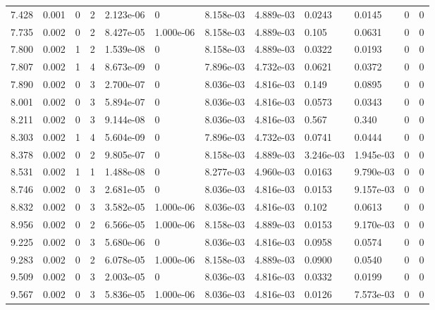 \documentclass[preview]{standalone}
\begin{document}
{{{\begin{tabular}{L{1.2cm}C{1.2cm} C{0.3cm}C{0.5cm} C{1.4cm}C{1.4cm} C{1.4cm}C{1.4cm} C{1.6cm}C{1.6cm} C{1.6cm}C{1.6cm}}
  7.428  &  0.001  & 0     &  2 &  2.123e-06  & 0  &  8.158e-03&   4.889e-03& 0.0243 & 0.0145   &  0 & 0  \\ 
  7.735  &  0.002  & 0     &  2 &  8.427e-05  & 1.000e-06  &  8.158e-03&   4.889e-03& 0.105 & 0.0631   &  0 & 0  \\ 
  7.800  &  0.002  & 1     &  2 &  1.539e-08  & 0  &  8.158e-03&   4.889e-03& 0.0322 & 0.0193   &  0 & 0  \\ 
  7.807  &  0.002  & 1     &  4 &  8.673e-09  & 0  &  7.896e-03&   4.732e-03& 0.0621 & 0.0372   &  0 & 0  \\ 
  7.890  &  0.002  & 0     &  3 &  2.700e-07  & 0  &  8.036e-03&   4.816e-03& 0.149 & 0.0895   &  0 & 0  \\ 
  8.001  &  0.002  & 0     &  3 &  5.894e-07  & 0  &  8.036e-03&   4.816e-03& 0.0573 & 0.0343   &  0 & 0  \\ 
  8.211  &  0.002  & 0     &  3 &  9.144e-08  & 0  &  8.036e-03&   4.816e-03& 0.567 & 0.340   &  0 & 0  \\ 
  8.303  &  0.002  & 1     &  4 &  5.604e-09  & 0  &  7.896e-03&   4.732e-03& 0.0741 & 0.0444   &  0 & 0  \\ 
  8.378  &  0.002  & 0     &  2 &  9.805e-07  & 0  &  8.158e-03&   4.889e-03& 3.246e-03 & 1.945e-03   &  0 & 0  \\ 
  8.531  &  0.002  & 1     &  1 &  1.488e-08  & 0  &  8.277e-03&   4.960e-03& 0.0163 & 9.790e-03   &  0 & 0  \\ 
  8.746  &  0.002  & 0     &  3 &  2.681e-05  & 0  &  8.036e-03&   4.816e-03& 0.0153 & 9.157e-03   &  0 & 0  \\ 
  8.832  &  0.002  & 0     &  3 &  3.582e-05  & 1.000e-06  &  8.036e-03&   4.816e-03& 0.102 & 0.0613   &  0 & 0  \\ 
  8.956  &  0.002  & 0     &  2 &  6.566e-05  & 1.000e-06  &  8.158e-03&   4.889e-03& 0.0153 & 9.170e-03   &  0 & 0  \\ 
  9.225  &  0.002  & 0     &  3 &  5.680e-06  & 0  &  8.036e-03&   4.816e-03& 0.0958 & 0.0574   &  0 & 0  \\ 
  9.283  &  0.002  & 0     &  2 &  6.078e-05  & 1.000e-06  &  8.158e-03&   4.889e-03& 0.0900 & 0.0540   &  0 & 0  \\ 
  9.509  &  0.002  & 0     &  3 &  2.003e-05  & 0  &  8.036e-03&   4.816e-03& 0.0332 & 0.0199   &  0 & 0  \\ 
  9.567  &  0.002  & 0     &  3 &  5.836e-05  & 1.000e-06  &  8.036e-03&   4.816e-03& 0.0126 & 7.573e-03   &  0 & 0  \\ 

\end{tabular}}}}
\end{document}
